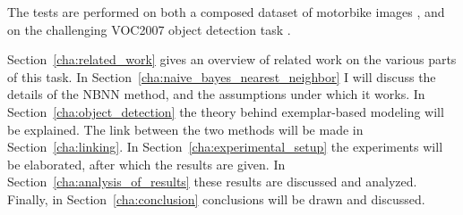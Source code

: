 The tests are performed on both a composed dataset of motorbike images \cite{becker2012codebook, fritz2005integrating}, and on the challenging VOC2007 object detection task \cite{pascal-voc-2007}.


Section~\ref{cha:related_work} gives an overview of related work on the various parts of this task. In Section~\ref{cha:naive_bayes_nearest_neighbor} I will discuss the details of the NBNN method, and the assumptions under which it works. In Section~\ref{cha:object_detection} the theory behind exemplar-based modeling will be explained. The link between the two methods will be made in Section~\ref{cha:linking}. In Section~\ref{cha:experimental_setup} the experiments will be elaborated, after which the results are given. In Section~\ref{cha:analysis_of_results} these results are discussed and analyzed. Finally, in Section~\ref{cha:conclusion} conclusions will be drawn and discussed.


